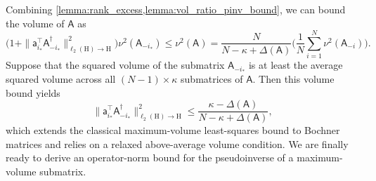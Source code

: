 \documentclass[onefignum,onetabnum]{siamart250211}
\renewenvironment{equation*}{\[}{\]\ignorespacesafterend}
\newcommand{\Hilb}{\mathrm{H}}
\newcommand{\Batrix}[1]{\bm{\Matrix{#1}}}
\newcommand{\Matrix}[1]{\mathsf{#1}}
\newcommand{\trans}{\intercal}
\newcommand{\pinv}{\dagger}
\newcommand{\Norm}[3][]{#1\| #2 #1\|_{\mathrm{#3}}}
\begin{document}
Combining \cref{lemma:rank_excess,lemma:vol_ratio_pinv_bound}, we can bound the volume of $\Batrix{A}$ as
\begin{equation*}
    \Big( 1 + \Norm{\Batrix{a}_{i_\ast}^\trans \Batrix{A}_{-i_\ast}^{\pinv}}{\ell_2(\Hilb) \to \Hilb}^2 \Big) \nu^2(\Batrix{A}_{-i_\ast}) \leq \nu^2(\Batrix{A}) = \frac{N}{N - \kappa + \Delta(\Batrix{A})} \bigg(\frac{1}{N} \sum_{i = 1}^{N} \nu^2(\Batrix{A}_{-i})\bigg).
\end{equation*}
Suppose that the squared volume of the submatrix $\Batrix{A}_{-i_\ast}$ is at least the average squared volume across all $(N-1) \times \kappa$ submatrices of $\Batrix{A}$.
Then this volume bound yields
\begin{equation}
\label{eq:maxvol_lsq_bound}
    \Norm{\Batrix{a}_{i_\ast}^\trans \Batrix{A}_{-i_\ast}^{\pinv}}{\ell_2(\Hilb) \to \Hilb}^2 \leq \frac{\kappa - \Delta(\Batrix{A})}{N - \kappa + \Delta(\Batrix{A})},
\end{equation}
which extends the classical maximum-volume least-squares bound to Bochner matrices and relies on a relaxed above-average volume condition.
We are finally ready to derive an operator-norm bound for the pseudoinverse of a maximum-volume submatrix.
\end{document}
